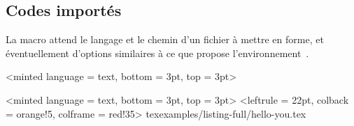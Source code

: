 \documentclass{../main/main}
\begin{document}
\subsection{Codes importés}

La macro \tdoclatexin{\tdoccodeinput} attend le langage et le chemin d'un fichier à mettre en forme, et éventuellement d'options similaires à ce que propose l'environnement \,.



\begin{tdocexa}
	\leavevmode

    \begin{tdoclatex}<minted language = text, bottom = 3pt, top = 3pt>
    \end{tdoclatex}
\end{tdocexa}



\begin{tdocexa}
	\leavevmode

    \begin{tdoclatex}<minted language = text, bottom = 3pt, top = 3pt>
\tdoccodeinput[style = solarized-light, linenos]%
              <leftrule = 22pt, colback = orange!5, colframe = red!35>%
              {tex}{examples/listing-full/hello-you.tex}
    \end{tdoclatex}
\end{tdocexa}
\end{document}
